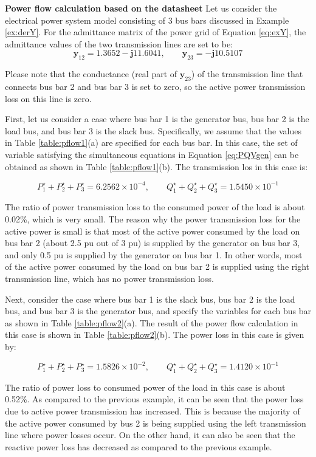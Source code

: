 \documentclass[graybox, envcountchap]{svmult}
\begin{document}
\begin{example}{\textbf{Power flow calculation based on the datasheet}}\label{ex:pf3bus}
Let us consider the electrical power system model consisting of 3 bus bars
discussed in Example \ref{ex:derY}. For the admittance matrix of the power grid
of Equation \ref{eq:exY}, the admittance values of the two transmission lines
are set to be:
\begin{equation}\label{eq:rightlossless}
  \bm{y}_{12} = 1.3652 - \bm{j} 11.6041, \qquad
  \bm{y}_{23} =  - \bm{j} 10.5107
\end{equation}

Please note that the conductance (real part of $\bm{y}_{23}$) of the
transmission line that connects bus bar 2 and bus bar 3 is set to zero, so the
active power transmission loss on this line is zero.

First, let us consider a case where bus bar 1 is the generator bus, bus bar 2 is
the load bus, and bus bar 3 is the slack bus.  Specifically, we assume that the
values in Table \ref{table:pflow1}(a) are specified for each bus bar.  In this
case, the set of variable satisfying the simultaneous equations in Equation
\ref{eq:PQVgen} can be obtained as shown in Table \ref{table:pflow1}(b). The
transmission los in this case is:

\[
  P_1^{\star} + P_2^{\star} + P_3^{\star} = 6.2562\times 10^{-4},
  \qquad 
  Q_1^{\star} + Q_2^{\star} + Q_3^{\star} =1.5450  \times 10^{-1}
\]

The ratio of power transmission loss to the consumed power of the load is about
0.02\%, which is very small. The reason why the power transmission loss for the
active power is small is that most of the active power consumed by the load on
bus bar 2 (about 2.5 pu out of 3 pu) is supplied by the generator on bus bar 3,
and only 0.5 pu is supplied by the generator on bus bar 1. In other words, most
of the active power consumed by the load on bus bar 2 is supplied using the right
transmission line, which has no power transmission loss.

Next, consider the case where bus bar 1 is the slack bus, bus bar 2 is the load
bus, and bus bar 3 is the generator bus, and specify the variables for each bus
bar as shown in Table \ref{table:pflow2}(a). The result of the power flow
calculation in this case is shown in Table \ref{table:pflow2}(b). The power loss in
this case is given by:

\[
  P_1^{\star} + P_2^{\star} + P_3^{\star} = 1.5826 \times 10^{-2},
  \qquad 
  Q_1^{\star} + Q_2^{\star} + Q_3^{\star} =1.4120  \times 10^{-1}
\]

The ratio of power loss to consumed power of the load in this case is about
0.52\%. As compared to the previous example, it can be seen that the power loss
due to active power transmission has increased. This is because the majority of
the active power consumed by bus 2 is being supplied using the left transmission
line where power losses occur. On the other hand, it can also be seen that the
reactive power loss has decreased as compared to the previous example.
\end{example}
\end{document}

